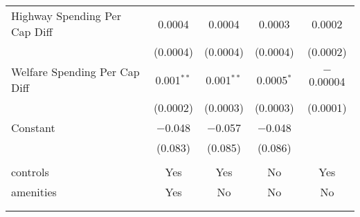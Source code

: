 \begin{table}[!htbp]
\begin{tabular}{@{\extracolsep{5pt}}lcccc}
  Highway Spending Per Cap Diff & 0.0004 & 0.0004 & 0.0003 & 0.0002 \\ 
  & (0.0004) & (0.0004) & (0.0004) & (0.0002) \\ 
  Welfare Spending Per Cap Diff & 0.001$^{**}$ & 0.001$^{**}$ & 0.0005$^{*}$ & $-$0.00004 \\ 
  & (0.0002) & (0.0003) & (0.0003) & (0.0001) \\ 
  Constant & $-$0.048 & $-$0.057 & $-$0.048 &  \\ 
  & (0.083) & (0.085) & (0.086) &  \\ 
 \hline \\[-1.8ex] 
controls & Yes & Yes & No & Yes \\ 
amenities & Yes & No & No & No \\ 
\hline \\[-1.8ex] 
\hline 
\hline \\[-1.8ex] 
\end{tabular} 
\end{table} 
